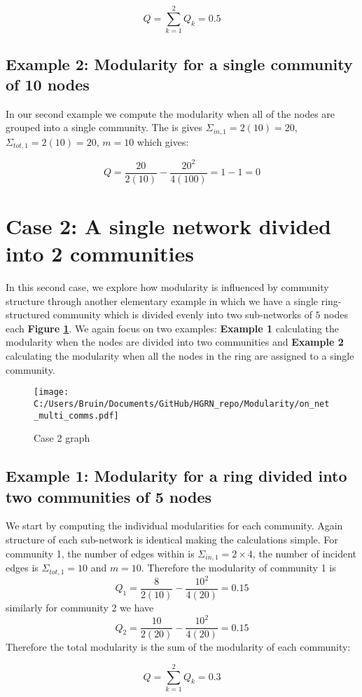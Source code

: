 \documentclass[a4paper,12pt]{article}
\begin{document}
	\[ Q = \sum_{k=1}^2 Q_k = 0.5\]
	\subsection*{Example 2: Modularity for a single community of 10 nodes}
	In our second example we compute the modularity when all of the nodes are grouped into a single community. The is gives $\Sigma_{in,1} = 2(10) = 20$, $\Sigma_{tot,1} = 2(10) = 20$,  $m = 10$ which gives:
	
	\[ Q = \frac{20}{2(10)}-\frac{20^2}{4(100)} = 1-1 = 0 \]
	
	

	\section{Case 2: A single network divided into 2 communities}
	In this second case, we explore how modularity is influenced by community structure through another elementary example in which we have a single ring-structured community which is divided evenly into two sub-networks of $5$ nodes each \textbf{\textbf{Figure \ref{fig:case2}}}. We again focus on two examples: \textbf{Example 1} calculating the modularity when the nodes are divided into two communities and \textbf{Example 2} calculating the modularity when all the nodes in the ring are assigned to a single community. 
	\begin{figure}[H]
		\centering
		\caption{Case 2 graph}
		\texttt{[image: C:/Users/Bruin/Documents/GitHub/HGRN\_repo/Modularity/on\_net\_multi\_comms.pdf]}
		\label{fig:case2}
	\end{figure}
	
	
	\subsection*{Example 1: Modularity for a ring divided into two communities of 5 nodes}
		We start by computing the individual modularities for each community. Again structure of each sub-network is identical making the calculations simple. For community 1, the number of edges within is $\Sigma_{in,1} = 2\times4$, the number of incident edges is $\Sigma_{tot,1} = 10$ and $m = 10$. Therefore the modularity of community 1 is 
		\[Q_1 = \frac{8}{2(10)} - \frac{10^2}{4(20)} = 0.15\]
		similarly for community 2 we have 
		\[Q_2 = \frac{10}{2(20)} - \frac{10^2}{4(20)} = 0.15\]
		Therefore the total modularity is the sum of the modularity of each community:
	
	\[ Q = \sum_{k=1}^2 Q_k = 0.3\]
	\newpage
\end{document}
